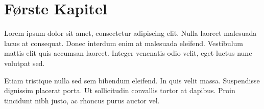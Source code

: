 \chapter{Første Kapitel}
Lorem ipsum dolor sit amet, consectetur adipiscing elit. Nulla laoreet malesuada lacus at consequat. Donec interdum enim at malesuada eleifend. Vestibulum mattis elit quis accumsan laoreet. Integer venenatis odio velit, eget luctus nunc volutpat sed.

Etiam tristique nulla sed sem bibendum eleifend. In quis velit massa. Suspendisse dignissim placerat porta. Ut sollicitudin convallis tortor at dapibus. Proin tincidunt nibh justo, ac rhoncus purus auctor vel.
